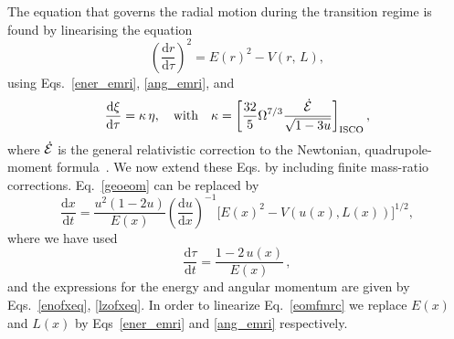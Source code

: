 \noindent The equation that governs the radial motion during the transition regime is found by linearising the equation 
\begin{equation}
\left(\frac{{\mathrm{d}}r}{{\mathrm{d}}\tau}\right)^2 = E(r)^2 - V(r,\,L),
\label{geoeom}
\end{equation}
\noindent using Eqs.~\eqref{ener_emri}, \eqref{ang_emri}, and
\begin{equation}
\label{xi_eq}
\frac{{\mathrm{d}}\xi}{{\mathrm{d}}\tau}= \kappa\, \eta, \quad {\rm{with}} \quad \kappa =\bigg[\frac{32}{5}\Omega^{7/3} \frac{\dot{{\cal{E}}}}{\sqrt{1-3u}}\bigg]_{\rm{ISCO}} \,,
\end{equation}
\noindent where \(\dot{{\cal{E}}}\) is the general relativistic correction to the Newtonian, quadrupole-moment formula~\cite{ori}. We now extend these Eqs. by including finite mass-ratio corrections. Eq.~\eqref{geoeom} can be replaced by 
\begin{equation}
\frac{{\mathrm{d}}x}{{\mathrm{d}}t}= \frac{u^2(1-2u)}{E(x) }\left(\frac{{\mathrm{d}}u}{{\mathrm{d}}x}\right)^{-1} \bigg[E(x)^2 - V\left(u(x),L(x)\right)\bigg]^{1/2},
\label{eomfmrc}
\end{equation}
 \noindent where we have used
 \begin{equation}
 \frac{{\mathrm{d}}\tau}{{\mathrm{d}}t}= \frac{1-2\,u(x)}{E(x)}\,,
 \label{tfact}
 \end{equation}
\noindent and the expressions for the energy and angular momentum are given by Eqs.~\eqref{enofxeq}, \eqref{lzofxeq}. In order to linearize Eq.~\eqref{eomfmrc} we replace $E(x)$ and $L(x)$ by Eqs~\eqref{ener_emri} and \eqref{ang_emri} respectively.

